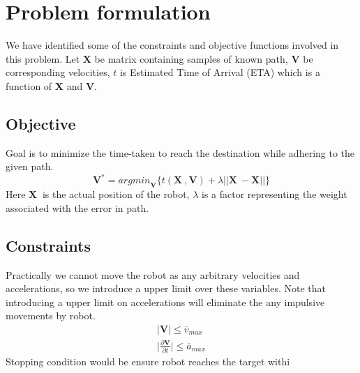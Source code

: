 \documentclass[10pt,twocolumn,letterpaper]{article}
\begin{document}
\section{Problem formulation}
We have identified some of the constraints and objective functions involved in this problem. 
Let $\mathbf{X}$ be matrix containing samples of known path, $\mathbf{V}$ be corresponding velocities, $t$ is Estimated Time of Arrival (ETA) which is a function of $\mathbf{X}$ and $\mathbf{V}$.

\subsection{Objective}
Goal is to minimize the time-taken to reach the destination while adhering to the given path.
\begin{equation} \label{eq:obj}
    \mathbf{V}^* = {argmin}_{\mathbf{V}} \{t(\mathbf{X^{~}}, \mathbf{V}) + \lambda||\mathbf{X}^{~} - \mathbf{X}||   \} 
\end{equation}
Here $\mathbf{X}^{~}$ is the actual position of the robot, $\lambda$ is a factor representing the weight associated with the error in path.

\subsection{Constraints}
Practically we cannot move the robot as any arbitrary velocities and accelerations, so we introduce a upper limit over these variables. Note that introducing a upper limit on accelerations will eliminate the any impulsive movements by robot.
\begin{gather}
    |\mathbf{V}| \le \overline{v}_{max}\\
    \Bigg|\frac{\partial \mathbf{V}}{\partial t}\Bigg| \le \overline{a}_{max}
\end{gather}
Stopping condition would be ensure robot reaches the target withi
{\small


}
\end{document}
